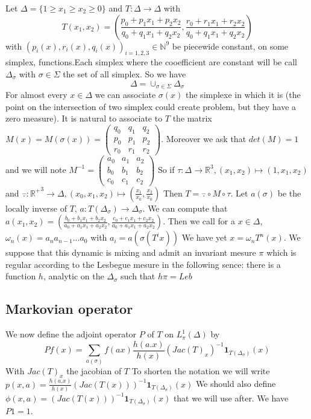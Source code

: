Let $\Delta=\{ 1 \geq x_1 \geq x_2 \geq 0 \}$ and $T:\Delta \to \Delta$ with \[ T(x_1,x_2)=(\frac{p_0+p_1 x_1+p_2 x_2}{q_0+q_1 x_1 +q_2 x_2},\frac{r_0+r_1 x_1+r_2 x_2}{q_0+q_1 x_1 +q_2 x_2}) \] with $(p_i(x),r_i(x),q_i(x))_{i=1,2,3}\in \mathbb{N}^9$ be piecewide constant, on some simplex, functions.Each simplex where the cooefficient are constant will be call $\Delta_\sigma$ with $\sigma \in \Sigma$ the set of all simplex. So we have
\[
\Delta = \cup_{\sigma \in \Sigma} \Delta_\sigma
\]
For almost every $x \in \Delta$ we can associate $\sigma(x)$ the simplexe in which it is (the point on the intersection of two simplex could create problem, but they have a zero measure).
\newline It is natural to associate to $T$ the matrix $M(x)=M(\sigma(x))=\begin{pmatrix} q_0 & q_1 & q_2 \\ p_0 & p_1 & p_2 \\ r_0 & r_1 & r_2 \end{pmatrix}$. Moreover we ask that $det(M)=1$ and we will note $M^{-1}=\begin{pmatrix} a_0 & a_1 & a_2 \\ b_0 & b_1 & b_2 \\ c_0 & c_1 & c_2 \end{pmatrix}$%
\newline
So if $\tau: \Delta \to \mathbb{R}^3, (x_1,x_2) \mapsto (1,x_1,x_2)$ and $\overset{-}{.}: \mathbb{R^+}^3 \to \Delta,(x_0,x_1,x_2) \mapsto (\frac{x_1}{x_0},\frac{x_2}{x_0})$
Then $T=\overset{-}{.} \circ M \circ \tau$.\newline
Let $a(\sigma)$ be the locally inverse of $T$, $a:T(\Delta_\sigma) \to \Delta_\sigma$. We can compute that $a(x_1,x_2)=(\frac{b_0+b_1 x_1 + b_2 x_2}{a_0 + a_1 x_1 + a_2 x_2},\frac{c_0 + c_1 x_1 + c_2 x_2}{a_0 + a_1 x_1 + a_2 x_2})$. Then we call for a $x \in \Delta$, $\omega_n(x)=a_n a_{n-1} ... a_0$ with $a_i=a(\sigma(T^i x))$\newline
We have yet $x=\omega_n T^n(x)$.
\newline
\color{green}
We suppose that this dynamic is mixing and admit an invariant mesure $\pi$ which is regular according to the Lesbegue mesure in the following sence: there is a function $h$, analytic on the $\Delta_\sigma$ such that $h \pi= Leb$
\color{black}

\subsection{Markovian operator}
We now define the adjoint operator $P$ of $T$ on $L^1_{\pi}(\Delta)$ by \[
Pf(x)=\sum_{a(\sigma)} f(a x)\frac{h(a.x)}{h(x)}(Jac(T)_x)^{-1} \mathbf{1} _{T(\Delta_\sigma)}(x)
\]
With $Jac(T)_x$ the jacobian of $T$\newline
To shorten the notation we will write $p(x,a)=\frac{h(a.x)}{h(x)}(Jac(T(x)))^{-1} \mathbf{1}_{T(\Delta_\sigma)}(x)$\newline
We should also define $\phi(x,a)=(Jac(T(x)))^{-1} \mathbf{1}_{T(\Delta_\sigma)}(x)$ that we will use after. \newline
We have $P1=1$.
